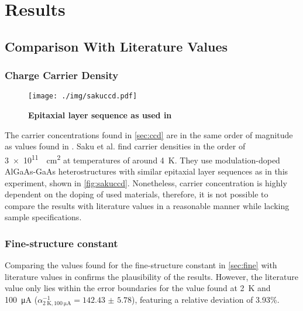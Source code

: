 \chapter{Results}

\section{Comparison With Literature Values} %
\subsection{Charge Carrier Density}
\begin{figure}
	\centering
	\texttt{[image: ./img/sakuccd.pdf]}
	\caption[Epitaxial layer sequence comparison]{\textbf{Epitaxial layer sequence as used in \cite{ccd}}}
	\label{fig:sakuccd}
\end{figure}
The carrier concentrations found in \autoref{sec:ccd} are in the same order of magnitude as values found in \cite{ccd}.
Saku et al. find carrier densities in the order of \SI{3e11}{\per\centi\meter\squared} at temperatures of around \SI{4}{\kelvin}.
They use modulation-doped AlGaAs-GaAs heterostructures with similar epitaxial layer sequences as in this experiment, shown in \autoref{fig:sakuccd}.
Nonetheless, carrier concentration is highly dependent on the doping of used materials, therefore, it is not possible to compare the results with literature values in a reasonable manner while lacking sample specifications.

\subsection{Fine-structure constant}
Comparing the values found for the fine-structure constant in \autoref{sec:fine} with literature values in \cite{NIST} confirms the plausibility of the results.
However, the literature value only lies within the error boundaries for the value found at \SI{2}{\kelvin} and \SI{100}{\micro\ampere} ($\alpha^{-1}_{\SI{2}{\kelvin},\SI{100}{\micro\ampere}} = \num{142.43(578)}$), featuring a relative deviation of \num{3.93}\%.

